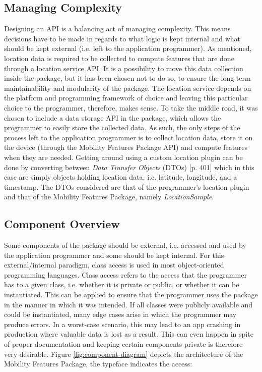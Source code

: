 \subsection{Managing Complexity}
Designing an API is a balancing act of managing complexity. This means decisions have to be made in regards to what logic is kept internal and what should be kept external (i.e. left to the application programmer). As mentioned, location data is required to be collected to compute features that are done through a location service API. It is a possibility to move this data collection inside the package, but it has been chosen not to do so, to ensure the long term maintainability and modularity of the package. The location service depends on the platform and programming framework of choice and leaving this particular choice to the programmer, therefore, makes sense. To take the middle road, it was chosen to include a data storage API in the package, which allows the programmer to easily store the collected data. As such, the only steps of the process left to the application programmer is to collect location data, store it on the device (through the Mobility Features Package API) and compute features when they are needed. Getting around using a custom location plugin can be done by converting between \textit{Data Transfer Objects} (DTOs) \cite{fowler-PEEA} [p. 401] which in this case are simply objects holding location data, i.e. latitude, longitude, and a timestamp. The DTOs considered are that of the programmer's location plugin and that of the Mobility Features Package, namely \textit{LocationSample}.

\subsection{Component Overview}
Some components of the package should be external, i.e. accessed and used by the application programmer and some should be kept internal. For this external/internal paradigm, class access is used in most object-oriented programming languages. Class access refers to the access that the programmer has to a given class, i.e. whether it is private or public, or whether it can be instantiated. This can be applied to ensure that the programmer uses the package in the manner in which it was intended. If all classes were publicly available and could be instantiated, many edge cases arise in which the programmer may produce errors. In a worst-case scenario, this may lead to an app crashing in production where valuable data is lost as a result. This can even happen in spite of proper documentation and keeping certain components private is therefore very desirable. Figure \ref{fig:component-diagram} depicts the architecture of the Mobility Features Package, the typeface indicates the access: 
 
